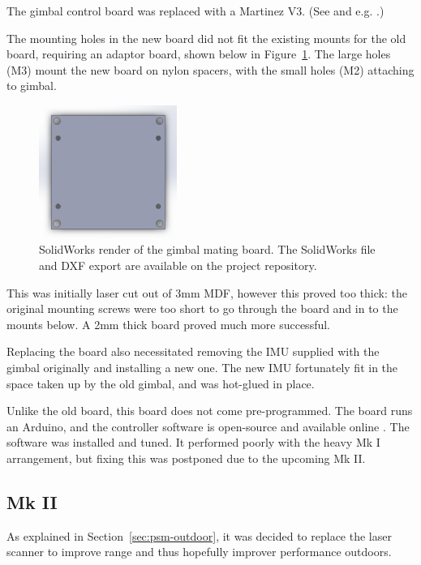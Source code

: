 \documentclass[12pt,oneside,a4paper]{book}
\begin{document}
The gimbal control board was replaced with a Martinez V3. (See  and e.g. \cite{martinez}.)

The mounting holes in the new board did not fit the existing
mounts for the old board, requiring an adaptor board, shown below in
Figure~\ref{fig:gmb}. The large holes (M3) mount the new board on
nylon spacers, with the small holes (M2) attaching to gimbal.

\begin{figure}[h]
  \centering
  \includegraphics[width=0.4\textwidth]{figs/gmb}
  \caption{SolidWorks render of the gimbal mating board. The
    SolidWorks file and DXF export are available on the project repository.}
  \label{fig:gmb}
\end{figure}

This was initially laser cut out of 3mm MDF,
however this proved too thick: the original mounting screws were too
short to go through the board and in to the mounts below. A 2mm thick board
proved much more successful.
 
Replacing the board also necessitated removing the IMU supplied with
the gimbal originally and installing a new one. The new IMU
fortunately fit in the space taken up by the old gimbal, and was
hot-glued in place.

Unlike the old board, this board does not come pre-programmed. The
board runs an Arduino, and the controller software is open-source and
available online \cite{gimbalsoftware}. The software was installed and
tuned. It performed poorly with the heavy Mk I arrangement, but fixing
this was postponed due to the upcoming Mk II.

\subsection{Mk II}
\label{sec:mk-ii}

As explained in Section~\ref{sec:psm-outdoor}, it was decided to
replace the laser scanner to improve range and thus hopefully improver
performance outdoors.
\end{document}
